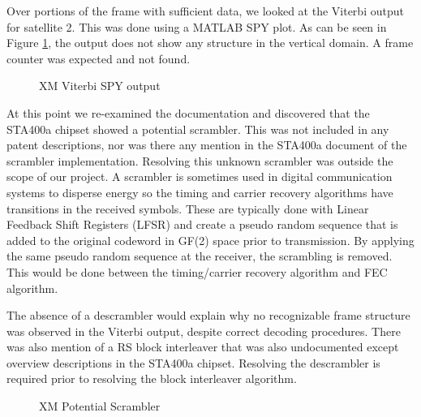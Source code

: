 \documentclass[conference,onecolumn]{IEEEtran}
\begin{document}
Over portions of the frame with sufficient data, we looked at the Viterbi output for satellite 2.  This was done using a MATLAB SPY plot.  As can be seen in Figure \ref{fig::Viterbi_spy}, the output does not show any structure in the vertical domain.  A frame counter was expected and not found.

\begin{figure}[H]
	\centerline{}
	\caption{XM Viterbi SPY output}
	\label{fig::Viterbi_spy}
\end{figure}

At this point we re-examined the documentation and discovered that the STA400a chipset showed a potential scrambler.  This was not included in any patent descriptions, nor was there any mention in the STA400a document of the scrambler implementation.  Resolving this unknown scrambler was outside the scope of our project.  A scrambler is sometimes used in digital communication systems to disperse energy so the timing and carrier recovery algorithms have transitions in the received symbols.  These are typically done with Linear Feedback Shift Registers (LFSR) and create a pseudo random sequence that is added to the original codeword in GF(2) space prior to transmission.  By applying the same pseudo random sequence at the receiver, the scrambling is removed.  This would be done between the timing/carrier recovery algorithm and FEC algorithm.

The absence of a descrambler would explain why no recognizable frame structure was observed in the Viterbi output, despite correct decoding procedures.  There was also mention of a RS block interleaver that was also undocumented except overview descriptions in the STA400a chipset.  Resolving the descrambler is required prior to resolving the block interleaver algorithm. 

\begin{figure}[H]
	\centerline{}
	\caption{XM Potential Scrambler \cite{alldatasheetcom_2015_sta400a}}
	\label{fig::scrambler}
\end{figure}
\end{document}
